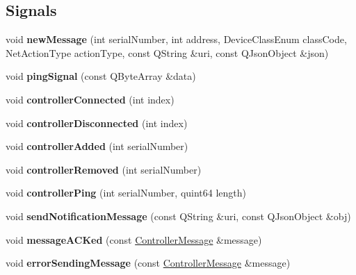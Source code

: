 \subsection*{Signals}
\begin{DoxyCompactItemize}
\item 
\mbox{\label{class_controller_manager_a629cadb89ec8cade7b8643e5449dda3b}} 
void {\bfseries new\+Message} (int serial\+Number, int address, Device\+Class\+Enum class\+Code, Net\+Action\+Type action\+Type, const Q\+String \&uri, const Q\+Json\+Object \&json)
\item 
\mbox{\label{class_controller_manager_a6fe23485207cf1876383035a75406472}} 
void {\bfseries ping\+Signal} (const Q\+Byte\+Array \&data)
\item 
\mbox{\label{class_controller_manager_a1392fb567beb3f56cfa785b0e22a3f66}} 
void {\bfseries controller\+Connected} (int index)
\item 
\mbox{\label{class_controller_manager_ab8ba90b458fd9d908750780fbec96648}} 
void {\bfseries controller\+Disconnected} (int index)
\item 
\mbox{\label{class_controller_manager_a9805e7ba56ec76fe4f6157c2efa84164}} 
void {\bfseries controller\+Added} (int serial\+Number)
\item 
\mbox{\label{class_controller_manager_a1c7c0a7ede1844ebddd7c3f215fe9377}} 
void {\bfseries controller\+Removed} (int serial\+Number)
\item 
\mbox{\label{class_controller_manager_a74826c977cd8ed4afeafb6da847e69bb}} 
void {\bfseries controller\+Ping} (int serial\+Number, quint64 length)
\item 
\mbox{\label{class_controller_manager_a179fc638c42252b49c845d0d0e2add56}} 
void {\bfseries send\+Notification\+Message} (const Q\+String \&uri, const Q\+Json\+Object \&obj)
\item 
\mbox{\label{class_controller_manager_a0985111d1a21bae456a3172769528f0a}} 
void {\bfseries message\+A\+C\+Ked} (const \hyperlink{class_controller_message}{Controller\+Message} \&message)
\item 
\mbox{\label{class_controller_manager_a7ce297aa4924004dbc5471874a17d6b9}} 
void {\bfseries error\+Sending\+Message} (const \hyperlink{class_controller_message}{Controller\+Message} \&message)
\end{DoxyCompactItemize}
